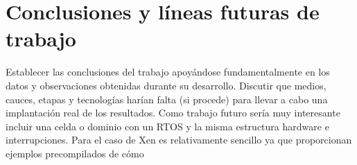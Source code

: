 \chapter{Conclusiones y líneas futuras de trabajo}

Establecer las conclusiones del trabajo apoyándose fundamentalmente en los datos y observaciones obtenidas durante su desarrollo. Discutir que medios, cauces, etapas y tecnologías harían falta (si procede) para llevar a cabo una implantación real de los resultados.
Como trabajo futuro sería muy interesante incluir una celda o dominio con un \acrshort{RTOS} y la misma estructura hardware e interrupciones. Para el caso de Xen es relativamente sencillo ya que proporcionan ejemplos precompilados de cómo 
